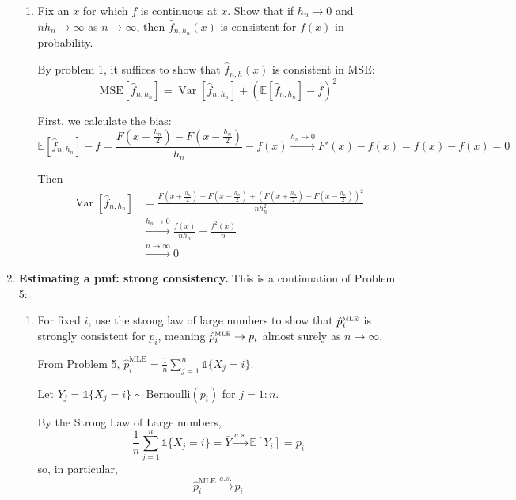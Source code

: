 \documentclass[11pt]{report}
\DeclareMathOperator{\Var}{\text{Var}}
\newcommand{\ind}{{\mathds{1}}}
\newcommand{\E}{\mathbb{E}}
\begin{document}
\begin{enumerate}[1.]
\begin{enumerate}
              \item Fix an $x$ for which $f$ is continuous at $x$.  Show that if $h_n\to 0$ and $nh_n\to\infty$ as $n\to\infty$, then $\widehat f_{n,h_n}(x)$ is consistent for $f(x)$ in probability.

                    \color{blue}
                    By problem 1, it suffices to show that $\hat f_{n, h}(x)$ is consistent in MSE:
                    \[\text{MSE}[\hat f_{n, h_n}]  = \Var[\hat f_{n, h_n}] + (\E[\hat f_{n, h_n}] - f)^2\]

                    First, we calculate the bias:
                    \[\E[\hat f_{n, h_n}] - f = \frac{F(x + \frac{h_n}{2}) - F(x - \frac{h_n}{2})}{h_n} - f(x) \overset{h_n \to 0}{\longrightarrow} F'(x) - f(x) = f(x) - f(x) = 0 \]

                    Then
                    \begin{align*}
                        \Var[\hat f_{n, h_n}] & = \frac{F(x + \frac{h_n}{2}) - F(x - \frac{h_n}{2}) + (F(x + \frac{h_n}{2}) - F(x - \frac{h_n}{2}))^2}{nh_n^2} \\
                                              & \overset{h_n \to 0}{\longrightarrow} \frac{f(x)}{nh_n} + \frac{f^2(x)}{n}                                      \\
                                              & \overset{n \to \infty}{\longrightarrow} 0
                    \end{align*}

                    \color{black}

          \end{enumerate}

          \pagebreak


    \item {\bf Estimating a pmf: strong consistency.} This is a continuation of Problem 5:
          \begin{enumerate}
              \item For fixed $i$, use the strong law of large numbers to show that $\hat p^{\text{\tiny MLE}}_i$ is strongly consistent for $p_i$, meaning $\hat p^{\text{\tiny MLE}}_i\to p_i$ almost surely as $n\to\infty$.

                    \color{blue}
                    From Problem 5, $\hat p_i^{\text{MLE}} = \frac{1}{n}\sum_{j=1}^{n} \ind\{X_j = i\}$.

                    Let $Y_j = \ind\{X_j = i\} \sim \text{Bernoulli}(p_i)$ for $j=1:n$.

                    By the Strong Law of Large numbers,
                    \[\frac{1}{n}\sum_{j=1}^{n} \ind\{X_j = i\} = \bar Y \overset{a.s.}{\longrightarrow} \E[Y_i] = p_i\]
                    so, in particular,
                    \[\hat p_i^{\text{MLE}} \overset{a.s.}{\longrightarrow} p_i\]


\end{enumerate}
\end{enumerate}
\end{document}
